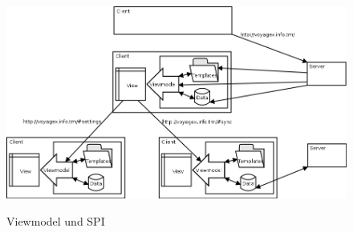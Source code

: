   \begin{figure}[H]
      \centering
	  \includegraphics[scale=0.48]{bilder/spi.png}\\ 
  	  \caption{Viewmodel und SPI}
  \end{figure}


